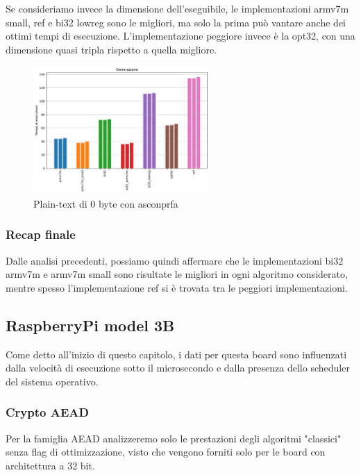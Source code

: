 \documentclass[12pt,a4paper,italian]{report}
\begin{document}
\noindent Se consideriamo invece la dimensione dell'eseguibile, le implementazioni armv7m small, ref e bi32 lowreg sono le migliori, ma solo la prima può vantare anche dei ottimi tempi di esecuzione. L'implementazione peggiore invece è la opt32, con una dimensione quasi tripla rispetto a quella migliore.

\begin{figure}[H]
    \centering
    \includegraphics[width=0.6\textwidth]{arduino/asconprfa.pdf}
    \caption{Plain-text di 0 byte con asconprfa}
\end{figure}

\subsubsection{Recap finale}

Dalle analisi precedenti, possiamo quindi affermare che le implementazioni bi32 armv7m e armv7m small sono risultate le migliori in ogni algoritmo considerato, mentre spesso l'implementazione ref si è trovata tra le peggiori implementazioni.

\subsection{RaspberryPi model 3B}

Come detto all'inizio di questo capitolo, i dati per questa board sono influenzati dalla velocità di esecuzione sotto il microsecondo e dalla presenza dello scheduler del sistema operativo.

\subsubsection{Crypto AEAD}

Per la famiglia AEAD analizzeremo solo le prestazioni degli algoritmi "classici" senza flag di ottimizzazione, visto che vengono forniti solo per le board con architettura a 32 bit.
\end{document}
